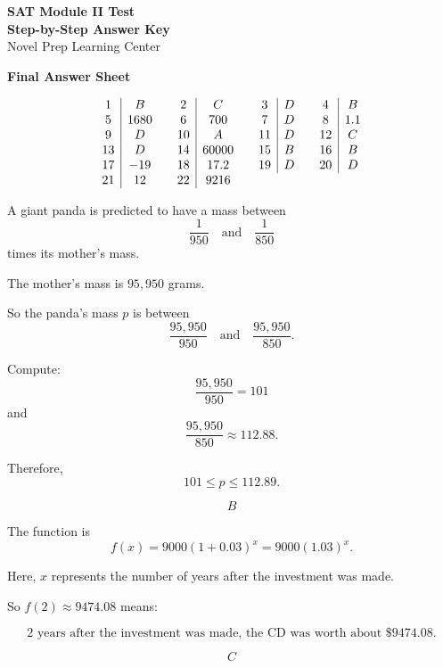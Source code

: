 \documentclass[11pt]{article}
\newcommand{\circnum}[1]{%
\tikz[baseline=(char.base)]{
\node[
circle,
draw=nppurpledark,
fill=nplight,
inner sep=1.4pt,
line width=0.8pt,
text=nppurpledark
] (char) {\small\textbf{#1}};
}}
\begin{document}
\begin{center}
    {\LARGE \textbf{SAT Module II Test}}\\[0.25em]
    {\Large \textbf{Step-by-Step Answer Key}}\\[0.25em]
    {\large Novel Prep Learning Center}
\end{center}

\begin{answerbox}
\textbf{Final Answer Sheet}

\[
\begin{array}{c|c@{\qquad}c|c@{\qquad}c|c@{\qquad}c|c}
1 & B & 2 & C & 3 & D & 4 & B\\
5 & 1680 & 6 & 700 & 7 & D & 8 & 1.1\\
9 & D & 10 & A & 11 & D & 12 & C\\
13 & D & 14 & 60000 & 15 & B & 16 & B\\
17 & -19 & 18 & 17.2 & 19 & D & 20 & D\\
21 & 12 & 22 & 9216
\end{array}
\]
\end{answerbox}

\bigskip

\textbf{\circnum{1}}

A giant panda is predicted to have a mass between
\[
\frac{1}{950}
\quad\text{and}\quad
\frac{1}{850}
\]
times its mother's mass.

The mother's mass is \(95{,}950\) grams.

So the panda's mass \(p\) is between
\[
\frac{95{,}950}{950}
\quad\text{and}\quad
\frac{95{,}950}{850}.
\]

Compute:
\[
\frac{95{,}950}{950}=101
\]
and
\[
\frac{95{,}950}{850}\approx 112.88.
\]

Therefore,
\[
101\le p\le 112.89.
\]

\[
\boxed{B}
\]

\bigskip

\textbf{\circnum{2}}

The function is
\[
f(x)=9000(1+0.03)^x=9000(1.03)^x.
\]

Here, \(x\) represents the number of years after the investment was made.

So \(f(2)\approx 9474.08\) means:

\[
\text{2 years after the investment was made, the CD was worth about } \$9474.08.
\]

\[
\boxed{C}
\]
\end{document}
